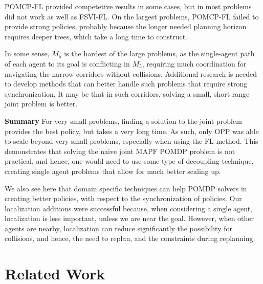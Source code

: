 \documentclass[letterpaper]{article} %
\begin{document}
POMCP-FL provided competetive results in some cases, but in most problems did not work as well as FSVI-FL. On the largest problems, POMCP-FL failed to provide strong policies, probably because the longer needed planning horizon requires deeper trees, which take a long time to construct.

In some sense, $M_5$ is the hardest of the large problems, as the single-agent path of each agent to its goal is conflicting in $M_5$, requiring much coordination for navigating the narrow corridors without collisions.
Additional research is needed to develop methods that can better handle such problems that require strong synchronization. It may be that in such corridors, solving a small, short range joint problem is better.

\noindent\textbf{Summary} For very small problems, finding a solution to the joint problem provides the best policy, but takes a very long time. As such, only OPP was able to scale beyond very small problems, especially when using the FL method. This demonstrates that solving the naive joint MAPF POMDP problem is not practical, and hence, one would need to use some type of decoupling technique, creating single agent problems that allow for much better scaling up.

We also see here that domain specific techniques can help POMDP solvers in creating better policies, with respect to the synchronization of policies. Our localization additions were successful because, when considering a single agent, localization is less important, unless we are near the goal. However, when other agents are nearby, localization can reduce significantly the possibility for collisions, and hence, the need to replan, and the constraints during replanning.




\section{Related Work}
\end{document}
